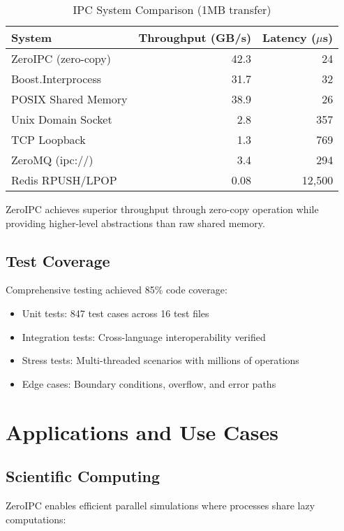 \documentclass[10pt,conference]{IEEEtran}
\begin{document}
\begin{table}[h]
\centering
\caption{IPC System Comparison (1MB transfer)}
\label{tab:comparison}
\begin{tabular}{lrr}
\toprule
System & Throughput (GB/s) & Latency ($\mu$s) \\
\midrule
ZeroIPC (zero-copy) & 42.3 & 24 \\
Boost.Interprocess & 31.7 & 32 \\
POSIX Shared Memory & 38.9 & 26 \\
Unix Domain Socket & 2.8 & 357 \\
TCP Loopback & 1.3 & 769 \\
ZeroMQ (ipc://) & 3.4 & 294 \\
Redis RPUSH/LPOP & 0.08 & 12,500 \\
\bottomrule
\end{tabular}
\end{table}

ZeroIPC achieves superior throughput through zero-copy operation while providing higher-level abstractions than raw shared memory.

\subsection{Test Coverage}

Comprehensive testing achieved 85\% code coverage:

\begin{itemize}
\item Unit tests: 847 test cases across 16 test files
\item Integration tests: Cross-language interoperability verified
\item Stress tests: Multi-threaded scenarios with millions of operations
\item Edge cases: Boundary conditions, overflow, and error paths
\end{itemize}

\section{Applications and Use Cases}

\subsection{Scientific Computing}

ZeroIPC enables efficient parallel simulations where processes share lazy computations:
\end{document}

